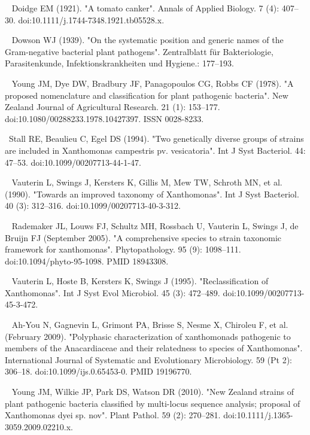 \documentclass[11pt]{article}
\begin{document}
\begin{thebibliography}{3}
	~ Doidge EM (1921). "A tomato canker". Annals of Applied Biology. 7 (4): 407–30. doi:10.1111/j.1744-7348.1921.tb05528.x.
	
	~ Dowson WJ (1939). "On the systematic position and generic names of the Gram-negative bacterial plant pathogens". Zentralblatt für Bakteriologie, Parasitenkunde, Infektionskrankheiten und Hygiene.: 177–193.
	
	~ Young JM, Dye DW, Bradbury JF, Panagopoulos CG, Robbs CF (1978). "A proposed nomenclature and classification for plant pathogenic bacteria". New Zealand Journal of Agricultural Research. 21 (1): 153–177. doi:10.1080/00288233.1978.10427397. ISSN 0028-8233.
	
	~Stall RE, Beaulieu C, Egel DS (1994). "Two genetically diverse groups of strains are included in Xanthomonas campestris pv. vesicatoria". Int J Syst Bacteriol. 44: 47–53. doi:10.1099/00207713-44-1-47.
	
	~ Vauterin L, Swings J, Kersters K, Gillis M, Mew TW, Schroth MN, et al. (1990). "Towards an improved taxonomy of Xanthomonas". Int J Syst Bacteriol. 40 (3): 312–316. doi:10.1099/00207713-40-3-312.
	
	~ Rademaker JL, Louws FJ, Schultz MH, Rossbach U, Vauterin L, Swings J, de Bruijn FJ (September 2005). "A comprehensive species to strain taxonomic framework for xanthomonas". Phytopathology. 95 (9): 1098–111. doi:10.1094/phyto-95-1098. PMID 18943308.
	
	~ Vauterin L, Hoste B, Kersters K, Swings J (1995). "Reclassification of Xanthomonas". Int J Syst Evol Microbiol. 45 (3): 472–489. doi:10.1099/00207713-45-3-472.
	
	~ Ah-You N, Gagnevin L, Grimont PA, Brisse S, Nesme X, Chiroleu F, et al. (February 2009). "Polyphasic characterization of xanthomonads pathogenic to members of the Anacardiaceae and their relatedness to species of Xanthomonas". International Journal of Systematic and Evolutionary Microbiology. 59 (Pt 2): 306–18. doi:10.1099/ijs.0.65453-0. PMID 19196770.
	
	~ Young JM, Wilkie JP, Park DS, Watson DR (2010). "New Zealand strains of plant pathogenic bacteria classified by multi-locus sequence analysis; proposal of Xanthomonas dyei sp. nov". Plant Pathol. 59 (2): 270–281. doi:10.1111/j.1365-3059.2009.02210.x.
	

\end{thebibliography}
\end{document}
